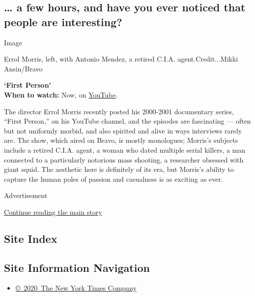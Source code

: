\hypertarget{-a-few-hours-and-have-you-ever-noticed-that-people-are-interesting}{%
\subsection{\ldots{} a few hours, and have you ever noticed that people
are
interesting?}\label{-a-few-hours-and-have-you-ever-noticed-that-people-are-interesting}}

Image

Errol Morris, left, with Antonio Mendez, a retired C.I.A.
agent.Credit...Mikki Ansin/Bravo

\textbf{`First Person'}\\
\textbf{When to watch:} Now, on
\href{https://www.youtube.com/watch?v=IhyNRRJPOb4\&list=PLVmRJGCDzW4QL42BGfwC-QpMMl46zDGJ9}{YouTube}.

The director Errol Morris recently posted his 2000-2001 documentary
series, ``First Person,'' on his YouTube channel, and the episodes are
fascinating --- often but not uniformly morbid, and also spirited and
alive in ways interviews rarely are. The show, which aired on Bravo, is
mostly monologues; Morris's subjects include a retired C.I.A. agent, a
woman who dated multiple serial killers, a man connected to a
particularly notorious mass shooting, a researcher obsessed with giant
squid. The aesthetic here is definitely of its era, but Morris's ability
to capture the human poles of passion and casualness is as exciting as
ever.

Advertisement

\protect\hyperlink{after-bottom}{Continue reading the main story}

\hypertarget{site-index}{%
\subsection{Site Index}\label{site-index}}

\hypertarget{site-information-navigation}{%
\subsection{Site Information
Navigation}\label{site-information-navigation}}

\begin{itemize}
\tightlist
\item
  \href{https://help.nytimes3xbfgragh.onion/hc/en-us/articles/115014792127-Copyright-notice}{©~2020~The
  New York Times Company}
\end{itemize}

